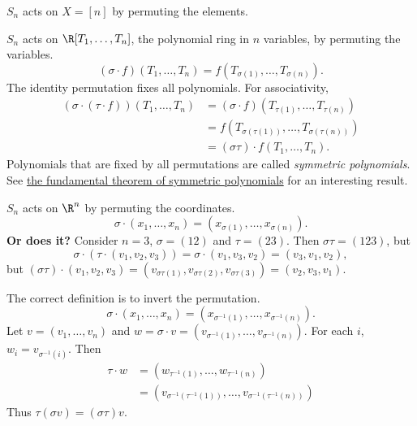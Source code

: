 \begin{examples}
    \item $S_n$ acts on $X = [n]$ by permuting the elements.
    \item $S_n$ acts on $\R[T_1, \dots, T_n]$, the polynomial ring in $n$
        variables, by permuting the variables. \[
            (\sigma \cdot f)(T_1, \dots, T_n)
                = f(T_{\sigma(1)}, \dots, T_{\sigma(n)}).
        \] The identity permutation fixes all polynomials.
        For associativity, \begin{align*}
            (\sigma \cdot (\tau \cdot f))(T_1, \dots, T_n)
                &= (\sigma \cdot f)(T_{\tau(1)}, \dots, T_{\tau(n)}) \\
                &= f(T_{\sigma(\tau(1))}, \dots, T_{\sigma(\tau(n))}) \\
                &= (\sigma \tau) \cdot f(T_1, \dots, T_n).
        \end{align*}
        Polynomials that are fixed by all permutations are
        called \emph{symmetric polynomials}.
        See \href{https://en.wikipedia.org/wiki/Elementary_symmetric_polynomial#Fundamental_theorem_of_symmetric_polynomials}
        {the fundamental theorem of symmetric polynomials}
        for an interesting result.
    \item $S_n$ acts on $\R^n$ by permuting the coordinates. \[
            \sigma \cdot (x_1, \dots, x_n)
                = (x_{\sigma(1)}, \dots, x_{\sigma(n)}).
        \] \textbf{Or does it?}
        Consider $n = 3$, $\sigma = (1 2)$ and $\tau = (2 3)$.
        Then $\sigma \tau = (1 2 3)$, but \[
            \sigma \cdot (\tau \cdot (v_1, v_2, v_3))
                = \sigma \cdot (v_1, v_3, v_2)
                = (v_3, v_1, v_2),
        \] but $(\sigma \tau) \cdot (v_1, v_2, v_3)
        = (v_{\sigma\tau(1)}, v_{\sigma\tau(2)}, v_{\sigma\tau(3)})
        = (v_2, v_3, v_1)$.

        The correct definition is to invert the permutation. \[
            \sigma \cdot (x_1, \dots, x_n)
                = (x_{\sigma^{-1}(1)}, \dots, x_{\sigma^{-1}(n)}).
        \]
        Let $v = (v_1, \dots, v_n)$ and $w = \sigma \cdot v
        = (v_{\sigma^{-1}(1)}, \dots, v_{\sigma^{-1}(n)})$.
        For each $i$, $w_i = v_{\sigma^{-1}(i)}$.
        Then \begin{align*}
            \tau \cdot w
                &= (w_{\tau^{-1}(1)}, \dots, w_{\tau^{-1}(n)}) \\
                &= (v_{\sigma^{-1}(\tau^{-1}(1))}, \dots,
                    v_{\sigma^{-1}(\tau^{-1}(n))})
        \end{align*}
        Thus $\tau (\sigma v) = (\sigma \tau) v$.
\end{examples}
